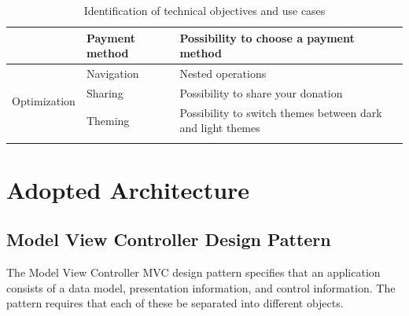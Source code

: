 \begin{longtable}{|m{10em}|m{10em}|m{10em}|}
                                           & \multirow{1}{*}{Payment method}          & Possibility to choose a payment method                     \\\hline
      \multirow{3}{*}{Optimization}        & \multirow{1}{*}{Navigation}              & Nested operations                                          \\\cline{2-3}
                                           & \multirow{1}{*}{Sharing}                 & Possibility to share your donation                         \\\cline{2-3}
                                           & \multirow{1}{*}{Theming}                 & Possibility to switch themes between dark and light themes \\\hline

      \caption{Identification of technical objectives and use cases}
      \label{tab:id_tech_objec_uc}
\end{longtable}





\section{Adopted Architecture}
\subsection{Model View Controller Design Pattern}

The Model View Controller \ac{MVC} design pattern specifies that an application consists of a data model, presentation information, and control information. The pattern requires that each of these be separated into different objects.


